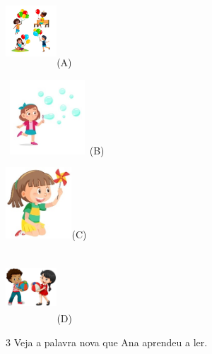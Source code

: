 \begin{escolha}
\item\includegraphics[width=0.75159in,height=1.04531in]{media/image78.jpeg}(A)

\item\includegraphics[width=1.23681in,height=1.10139in]{media/image79.jpeg}(B)

\item\includegraphics[width=0.97361in,height=1.05069in]{media/image80.jpeg}(C)

\item\includegraphics[width=0.75437in,height=1.04404in]{media/image81.jpeg}(D)
\end{escolha}


\num{3} Veja a palavra nova que Ana aprendeu a ler.

